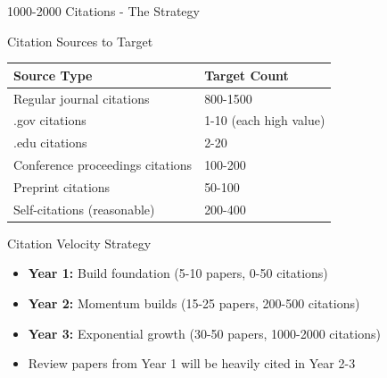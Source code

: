 \documentclass[11pt]{beamer}
\begin{document}
	\begin{frame}{1000-2000 Citations - The Strategy}
		\scriptsize
		\begin{block}{Citation Sources to Target}
			\centering
			\begin{tabular}{|p{4cm}|p{5.5cm}|}
				\hline
				\textbf{Source Type} & \textbf{Target Count} \\
				\hline
				Regular journal citations & 800-1500 \\
				\hline
				.gov citations & 1-10 (each high value) \\
				\hline
				.edu citations & 2-20 \\
				\hline
				Conference proceedings citations & 100-200 \\
				\hline
				Preprint citations & 50-100 \\
				\hline
				Self-citations (reasonable) & 200-400 \\
				\hline
			\end{tabular}
		\end{block}
		\begin{block}{Citation Velocity Strategy}
			\begin{itemize}
				\item \textbf{Year 1:} Build foundation (5-10 papers, 0-50 citations)
				\item \textbf{Year 2:} Momentum builds (15-25 papers, 200-500 citations)
				\item \textbf{Year 3:} Exponential growth (30-50 papers, 1000-2000 citations)
				\item Review papers from Year 1 will be heavily cited in Year 2-3
			\end{itemize}
		\end{block}
	\end{frame}
	
\end{document}
